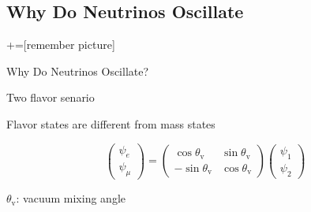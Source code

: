 
\subsection{Why Do Neutrinos Oscillate}

+=[remember picture]

\everymath{\displaystyle}


\begin{frame}{Why Do Neutrinos Oscillate?}

\begin{tcolorbox}[box align=center,halign=center,valign=center, standard jigsaw,opacityback=0, coltext=white]
Two flavor senario
\end{tcolorbox}

Flavor states are different from mass states

\begin{equation*}
\begin{pmatrix}
\psi_e\\
\psi_\mu
\end{pmatrix} = \begin{pmatrix}
\cos \theta_{\mathrm v} & \sin\theta_{\mathrm v} \\
-\sin \theta_{\mathrm v} & \cos \theta_{\mathrm v}
\end{pmatrix}\begin{pmatrix}
\psi_1\\
\psi_2
\end{pmatrix}
\end{equation*}


$\theta_{\mathrm v}$: vacuum mixing angle

\end{frame}



